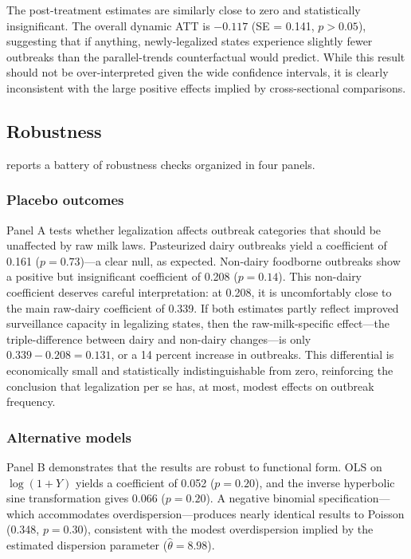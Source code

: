 \documentclass[12pt]{article}
\begin{document}
The post-treatment estimates are similarly close to zero and statistically insignificant. The overall dynamic ATT is $-0.117$ (SE = 0.141, $p > 0.05$), suggesting that if anything, newly-legalized states experience slightly fewer outbreaks than the parallel-trends counterfactual would predict. While this result should not be over-interpreted given the wide confidence intervals, it is clearly inconsistent with the large positive effects implied by cross-sectional comparisons.



\subsection{Robustness}

 reports a battery of robustness checks organized in four panels.

\subsubsection*{Placebo outcomes} Panel A tests whether legalization affects outbreak categories that should be unaffected by raw milk laws. Pasteurized dairy outbreaks yield a coefficient of 0.161 ($p = 0.73$)---a clear null, as expected. Non-dairy foodborne outbreaks show a positive but insignificant coefficient of 0.208 ($p = 0.14$). This non-dairy coefficient deserves careful interpretation: at 0.208, it is uncomfortably close to the main raw-dairy coefficient of 0.339. If both estimates partly reflect improved surveillance capacity in legalizing states, then the raw-milk-specific effect---the triple-difference between dairy and non-dairy changes---is only $0.339 - 0.208 = 0.131$, or a 14 percent increase in outbreaks. This differential is economically small and statistically indistinguishable from zero, reinforcing the conclusion that legalization per se has, at most, modest effects on outbreak frequency.

\subsubsection*{Alternative models} Panel B demonstrates that the results are robust to functional form. OLS on $\log(1 + Y)$ yields a coefficient of 0.052 ($p = 0.20$), and the inverse hyperbolic sine transformation gives 0.066 ($p = 0.20$). A negative binomial specification---which accommodates overdispersion---produces nearly identical results to Poisson (0.348, $p = 0.30$), consistent with the modest overdispersion implied by the estimated dispersion parameter ($\hat{\theta} = 8.98$).
\end{document}
